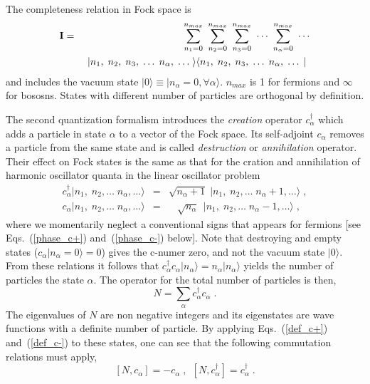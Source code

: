 The completeness relation in Fock space is
\begin{eqnarray}
 {\bf I} &=& \sum^{n_{max}}_{n_1=0}  ~ \sum^{n_{max}}_{n_2=0}  ~ 
           \sum^{n_{max}}_{n_3=0}  ~ \cdots ~ \sum^{n_{max}}_{n_\alpha=0}  ~ \cdots 
 \label{IFock}
\\
         & & ~ \vert    n_1, \; n_2, \; n_3, \; \ldots \; n_\alpha, \; \ldots \; \rangle 
               \langle  n_1, \; n_2, \; n_3, \; \ldots \; n_\alpha, \; \ldots \; \vert 
 ~
\nonumber 
\end{eqnarray}
and includes the vacuum state $\vert0\rangle\equiv\vert n_\alpha = 0, \forall \alpha\rangle$.
$n_{max}$ is 1 for fermions and $\infty$ for bososns.
States with different number of particles are orthogonal by definition.


The second quantization formalism introduces the {\em creation} operator $c^\dag_\alpha$ which adds a particle in state $\alpha$ to a vector of the Fock space. Its self-adjoint
$c_\alpha$ removes a particle from the same state and is called {\em destruction} or {\em annihilation} operator.
 Their effect on Fock states is the same as that for the cration and annihilation of harmonic oscillator quanta in the linear oscillator problem
\begin{eqnarray}
 c^\dag_\alpha \vert  n_1, \; n_2, \ldots \;  n_\alpha, \ldots  \rangle & = &
 \sqrt{n_\alpha+1} \; \vert  n_1, \; n_2, \ldots \;  n_\alpha+1, \ldots  \rangle \; , 
 \label{def_c+}
\\
 c_\alpha \vert  n_1, \; n_2, \ldots \;  n_\alpha, \ldots  \rangle & = &
 ~ ~ ~ ~ \sqrt{n_\alpha} ~ ~ \vert  n_1, \; n_2, \ldots \;  n_\alpha-1, \ldots  \rangle \; ,
 \label{def_c-}
\end{eqnarray}
where we momentarily neglect a conventional signs that appears for fermions [see Eqs.~(\ref{phase_c+}) and~(\ref{phase_c-}) below].
Note that destroying and empty states ($c_\alpha\vert  n_\alpha=0 \rangle=0$) gives the c-numer zero, and not the vacuum state $\vert0\rangle$.
%
From these relations it follows that $c^\dag_\alpha c_\alpha\vert n_\alpha\rangle=n_\alpha\vert n_\alpha\rangle$ yields the number of particles the state $\alpha$. The operator for the total number of particles is then,
\begin{equation}
 N = \sum_\alpha c^\dag_\alpha c_\alpha \; .
 \label{N_Op}
\end{equation}
The eigenvalues of $N$ are non negative integers and its eigenstates are wave functions with a definite number of particle. By applying Eqs.~(\ref{def_c+}) and~(\ref{def_c-}) to these states, one can see that the following commutation relations must apply,
\begin{equation}
 \left[ N , c_\alpha      \right] = - c_\alpha \; , ~ ~ 
 \left[ N , c^\dag_\alpha \right] =   c^\dag_\alpha \; .
\label{Ncomm}
\end{equation}


